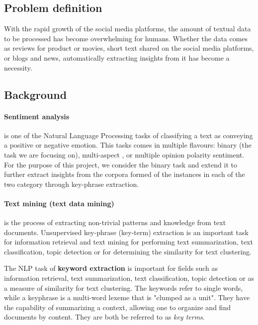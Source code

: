 \subsection{Problem definition}
With the rapid growth of the social media platforms, the amount of textual data to be processed has become overwhelming for humans. Whether the data comes as reviews for product or movies, short text shared on the social media platforms, or blogs and news, automatically extracting insights from it has become a necessity.


\subsection{Background}

\paragraph{Sentiment analysis} is one of the Natural Language Processing tasks of classifying a text as conveying a positive or negative emotion. This tasks comes in multiple flavours: binary (the task we are focusing on), multi-aspect \cite{multiaspect}, or multiple opinion polarity sentiment. For the purpose of this project, we consider the binary task and extend it to further extract insights from the corpora formed of the instances in each of the two category through key-phrase extraction.


\paragraph{Text mining (text data mining)} is the process of extracting non-trivial patterns and knowledge from text documents.
Unsupervised key-phrase (key-term) extraction is an important task for information retrieval and text mining for performing text summarization, text classification, topic detection or for determining the similarity for text clustering. 

The NLP task of \textbf{keyword extraction} is important for fields such as information retrieval, text summarization, text classification, topic detection or as a measure of similarity for text clustering. 
The keywords refer to single words, while a keyphrase is a multi-word lexeme that is "clumped as a unit"\cite{manningshutze}. They have the capability of summarizing a context, allowing one to organize and find documents by content. They are both be referred to as \textit{key terms}.

